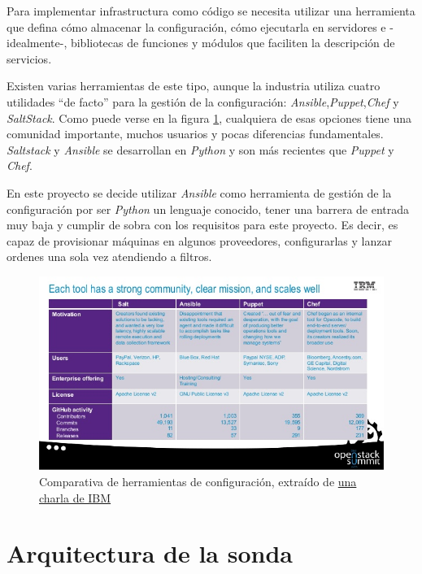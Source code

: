 Para implementar infrastructura como código se necesita utilizar una herramienta que defina cómo almacenar la configuración,
cómo ejecutarla en servidores e -idealmente-, bibliotecas de funciones y módulos que faciliten la descripción de servicios.

Existen varias herramientas de este tipo, aunque la industria utiliza cuatro utilidades ``de facto'' para la gestión de la configuración: \emph{Ansible},\emph{Puppet},\emph{Chef}
y  \emph{SaltStack}. Como puede verse en la figura \ref{fig:configmanagement1}, cualquiera de esas opciones tiene una comunidad importante, muchos usuarios y pocas diferencias
fundamentales. \emph{Saltstack} y \emph{Ansible} se desarrollan en \emph{Python} y son más recientes que \emph{Puppet} y \emph{Chef}.

En este proyecto se decide utilizar \emph{Ansible} como herramienta de gestión de la configuración por ser \emph{Python} un lenguaje conocido, tener una barrera de entrada muy baja
y cumplir de sobra con los requisitos para este proyecto. Es decir, es capaz de provisionar máquinas en algunos proveedores, configurarlas y lanzar ordenes una sola vez atendiendo a filtros.

\begin{figure}[h]
    \centering
      \includegraphics[scale=0.5]{images/configmanagement_tools1}
    \caption{Comparativa de herramientas de configuración, extraído de \href{https://www.slideshare.net/DanielKrook/caps-whats-best-for-deploying-and-managing-openstack-chef-vs-ansible-vs-puppet-vs-salt}{una charla de IBM}}
    \label{fig:configmanagement1}
  \end{figure}

\section{Arquitectura de la sonda}

